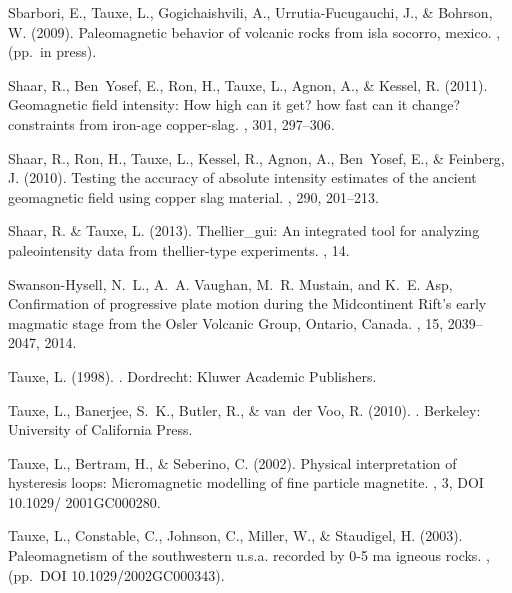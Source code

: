 \documentclass[11pt]{book}
\begin{document}
{{{\begin{thebibliography}{}
Sbarbori, E., Tauxe, L., Gogichaishvili, A., Urrutia-Fucugauchi, J., \&
  Bohrson, W. (2009).
\newblock Paleomagnetic behavior of volcanic rocks from isla socorro, mexico.
, (pp.\ in press).

Shaar, R., Ben~Yosef, E., Ron, H., Tauxe, L., Agnon, A., \& Kessel, R. (2011).
\newblock Geomagnetic field intensity: How high can it get? how fast can it
  change? constraints from iron-age copper-slag.
, 301, 297--306.

Shaar, R., Ron, H., Tauxe, L., Kessel, R., Agnon, A., Ben~Yosef, E., \&
  Feinberg, J. (2010).
\newblock Testing the accuracy of absolute intensity estimates of the ancient
  geomagnetic field using copper slag material.
, 290, 201--213.

Shaar, R. \& Tauxe, L. (2013).
\newblock Thellier\_gui: An integrated tool for analyzing paleointensity data
  from thellier-type experiments.
, 14.

Swanson-Hysell, N.~L., A.~A. Vaughan, M.~R. Mustain, and K.~E. Asp,
\newblock Confirmation of progressive plate motion during the Midcontinent Rift's early
  magmatic stage from the Osler Volcanic Group, Ontario, Canada.
  , 15, 2039--2047, 2014.

Tauxe, L. (1998).
.
\newblock Dordrecht: Kluwer Academic Publishers.

Tauxe, L., Banerjee, S.~K., Butler, R., \& van~der Voo, R. (2010).
.
\newblock Berkeley: University of California Press.

Tauxe, L., Bertram, H., \& Seberino, C. (2002).
\newblock Physical interpretation of hysteresis loops: Micromagnetic modelling
  of fine particle magnetite.
, 3, DOI 10.1029/ 2001GC000280.

Tauxe, L., Constable, C., Johnson, C., Miller, W., \& Staudigel, H. (2003).
\newblock Paleomagnetism of the southwestern u.s.a. recorded by 0-5 ma igneous
  rocks.
, (pp.\ DOI 10.1029/2002GC000343).


\end{thebibliography}}}}
\end{document}
